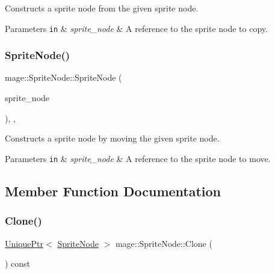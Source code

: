 Constructs a sprite node from the given sprite node.


\begin{DoxyParams}[1]{Parameters}
\mbox{\tt in}  & {\em sprite\+\_\+node} & A reference to the sprite node to copy. \\
\hline
\end{DoxyParams}
\hypertarget{classmage_1_1_sprite_node_a00b1a1e71603a653cad5fe4f42c7547f}{}\label{classmage_1_1_sprite_node_a00b1a1e71603a653cad5fe4f42c7547f} 
\subsubsection{\texorpdfstring{Sprite\+Node()}{SpriteNode()}\hspace{0.1cm}{\footnotesize\ttfamily [3/3]}}
{\footnotesize\ttfamily mage\+::\+Sprite\+Node\+::\+Sprite\+Node (\begin{DoxyParamCaption}\item[{\hyperlink{classmage_1_1_sprite_node}{Sprite\+Node} \&\&}]{sprite\+\_\+node }\end{DoxyParamCaption})\hspace{0.3cm}{\ttfamily [protected]}, {\ttfamily [default]}, {\ttfamily [noexcept]}}

Constructs a sprite node by moving the given sprite node.


\begin{DoxyParams}[1]{Parameters}
\mbox{\tt in}  & {\em sprite\+\_\+node} & A reference to the sprite node to move. \\
\hline
\end{DoxyParams}


\subsection{Member Function Documentation}
\hypertarget{classmage_1_1_sprite_node_a16481829a3796abd5afe5ce0c9ebf578}{}\label{classmage_1_1_sprite_node_a16481829a3796abd5afe5ce0c9ebf578} 
\subsubsection{\texorpdfstring{Clone()}{Clone()}}
{\footnotesize\ttfamily \hyperlink{namespacemage_a3316d7143a973e37adf1110f2e80ca31}{Unique\+Ptr}$<$ \hyperlink{classmage_1_1_sprite_node}{Sprite\+Node} $>$ mage\+::\+Sprite\+Node\+::\+Clone (\begin{DoxyParamCaption}{ }\end{DoxyParamCaption}) const}

